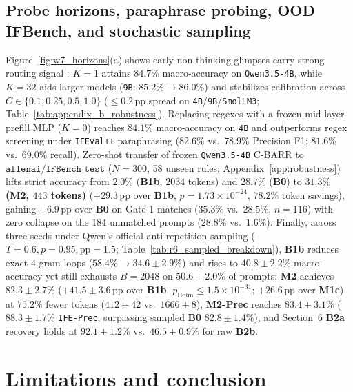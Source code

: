 \documentclass{article}
\begin{document}
\subsection{Probe horizons, paraphrase probing, OOD IFBench, and stochastic sampling}
Figure~\ref{fig:w7_horizons}(a) shows early non-thinking glimpses carry strong routing signal \cite{zeng2026glimprouter}: $K=1$ attains $84.7\%$ macro-accuracy on \texttt{Qwen3.5-4B}, while $K=32$ aids larger models (\texttt{9B}: $85.2\% \to 86.0\%$) and stabilizes calibration across $C \in \{0.1, 0.25, 0.5, 1.0\}$ ($\le 0.2$\,pp spread on \texttt{4B}/\texttt{9B}/\texttt{SmolLM3}; Table~\ref{tab:appendix_b_robustness}). Replacing regexes with a frozen mid-layer prefill MLP ($K=0$) reaches $84.1\%$ macro-accuracy on \texttt{4B} and outperforms regex screening under \texttt{IFEval++} paraphrasing \cite{dong2025ifevalpp} ($82.6\%$ vs.\ $78.9\%$ Precision F1; $81.6\%$ vs.\ $69.0\%$ recall). Zero-shot transfer of frozen \texttt{Qwen3.5-4B} C-BARR to $\texttt{allenai/IFBench\_test}$ ($N=300$, 58 unseen rules; Appendix~\ref{app:robustness}) lifts strict accuracy from $2.0\%$ (\textbf{B1b}, $2034$ tokens) and $28.7\%$ (\textbf{B0}) to \textbf{$31.3\%$ (\textbf{M2}, $443$ tokens)} ($+29.3$\,pp over \textbf{B1b}, $p = 1.73 \times 10^{-24}$, $78.2\%$ token savings), gaining $+6.9$\,pp over \textbf{B0} on Gate-1 matches ($35.3\%$ vs.\ $28.5\%$, $n=116$) with zero collapse on the $184$ unmatched prompts ($28.8\%$ vs.\ $1.6\%$). Finally, across three seeds under Qwen's official anti-repetition sampling ($T=0.6, p=0.95, \text{pp}=1.5$; Table~\ref{tab:r6_sampled_breakdown}), \textbf{B1b} reduces exact 4-gram loops ($58.4\% \to 34.6 \pm 2.9\%$) and rises to $40.8 \pm 2.2\%$ macro-accuracy yet still exhausts $B=2048$ on $50.6 \pm 2.0\%$ of prompts; \textbf{M2} achieves \textbf{$82.3 \pm 2.7\%$} ($+41.5 \pm 3.6$\,pp over \textbf{B1b}, $p_{\text{Holm}} \le 1.5 \times 10^{-31}$; $+26.6$\,pp over \textbf{M1c}) at $75.2\%$ fewer tokens ($412 \pm 42$ vs.\ $1666 \pm 8$), \textbf{M2-Prec} reaches \textbf{$83.4 \pm 3.1\%$} ($88.3 \pm 1.7\%$ \texttt{IFE-Prec}, surpassing sampled \textbf{B0} $82.8 \pm 1.4\%$), and Section~6 \textbf{B2a} recovery holds at $92.1 \pm 1.2\%$ vs.\ $46.5 \pm 0.9\%$ for raw \textbf{B2b}.

\section{Limitations and conclusion}
\label{sec:limitations}
\end{document}
